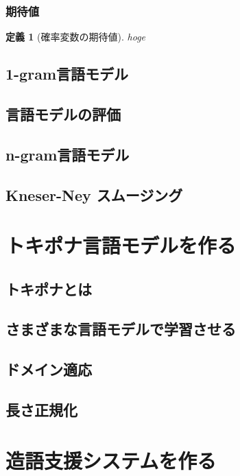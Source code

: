 \documentclass[11pt]{report}
\newtheorem{definition}[theorem]{定義}
\begin{document}
\subsection{期待値}

\begin{definition}[確率変数の期待値]
	hoge
\end{definition}

\section{1-gram言語モデル}

\section{言語モデルの評価}

\section{n-gram言語モデル}

\section{Kneser-Ney スムージング}

\chapter{トキポナ言語モデルを作る}

\section{トキポナとは}

\section{さまざまな言語モデルで学習させる}

\section{ドメイン適応}

\section{長さ正規化}

\chapter{造語支援システムを作る}
\end{document}
